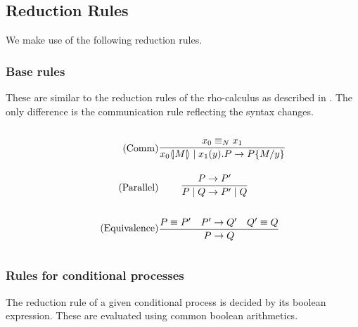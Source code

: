 \FloatBarrier

\subsection{Reduction Rules}
We make use of the following reduction rules.

\subsubsection{Base rules}
These are similar to the reduction rules of the rho-calculus as described in \citep{Meredith2005}. The only difference is the communication rule reflecting the syntax changes.

\begin{figure}[h]
\begin{align}
\tag{Comm} \infrule{x_0 \equiv_N x_1}{\lift{x_0}{M}\para\inp{x_1}{y}P\ra P\{M/y\}}&\\
\tag{Parallel} \infrule{P\ra P'}{P\para Q\ra P'\para Q}&\\
\tag{Equivalence} \infrule{P\equiv P'\quad P'\ra Q'\quad Q'\equiv Q}{P\ra Q}&
\end{align}
\end{figure}

%
%
%


\FloatBarrier

\subsubsection{Rules for conditional processes}
The reduction rule of a given conditional process is decided by its boolean expression. These are evaluated using common boolean arithmetics.

